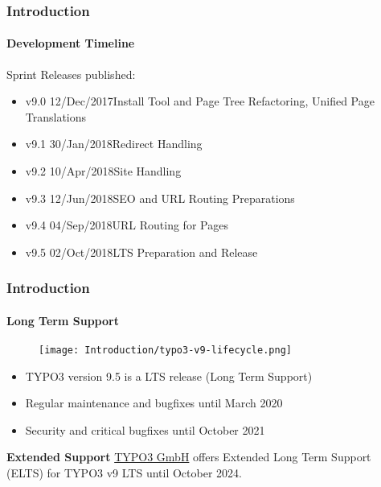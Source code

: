 
\begin{frame}[fragile]
	\frametitle{Introduction}
	\framesubtitle{Development Timeline}

	Sprint Releases published:

	\begin{itemize}
		\item v9.0 \tabto{1.1cm}12/Dec/2017\tabto{3.4cm}Install Tool and Page Tree Refactoring,\newline
			\tabto{3.4cm}Unified Page Translations
		\item v9.1 \tabto{1.1cm}30/Jan/2018\tabto{3.4cm}Redirect Handling
		\item v9.2 \tabto{1.1cm}10/Apr/2018\tabto{3.4cm}Site Handling
		\item v9.3 \tabto{1.1cm}12/Jun/2018\tabto{3.4cm}SEO and URL Routing Preparations
		\item v9.4 \tabto{1.1cm}04/Sep/2018\tabto{3.4cm}URL Routing for Pages
		\item v9.5 \tabto{1.1cm}02/Oct/2018\tabto{3.4cm}LTS Preparation and Release
	\end{itemize}

\end{frame}


\begin{frame}[fragile]
	\frametitle{Introduction}
	\framesubtitle{Long Term Support}

	\begin{figure}
		\texttt{[image: Introduction/typo3-v9-lifecycle.png]}
	\end{figure}

	\begin{itemize}
		\item TYPO3 version 9.5 is a LTS release (Long Term Support)
		\item Regular maintenance and bugfixes until March 2020
		\item Security and critical bugfixes until October 2021
	\end{itemize}
	\vspace{0.2cm}
	\textbf{Extended Support}\newline
	\smaller
		\href{https://typo3.com}{TYPO3 GmbH} offers Extended Long Term
			Support (ELTS) for TYPO3 v9 LTS until October 2024.
	\normalsize

\end{frame}

